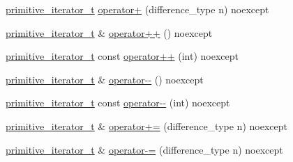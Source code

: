 \begin{DoxyCompactItemize}
\hyperlink{classnlohmann_1_1detail_1_1primitive__iterator__t}{primitive\+\_\+iterator\+\_\+t} \hyperlink{classnlohmann_1_1detail_1_1primitive__iterator__t_a00ce828d0fe58046c10e0445504df7bf}{operator+} (difference\+\_\+type n) noexcept
\item 
\hyperlink{classnlohmann_1_1detail_1_1primitive__iterator__t}{primitive\+\_\+iterator\+\_\+t} \& \hyperlink{classnlohmann_1_1detail_1_1primitive__iterator__t_ad26511012fc88f3ec5d9e1cb708732fd}{operator++} () noexcept
\item 
\hyperlink{classnlohmann_1_1detail_1_1primitive__iterator__t}{primitive\+\_\+iterator\+\_\+t} const \hyperlink{classnlohmann_1_1detail_1_1primitive__iterator__t_aa011863621357b3cf891670bf63a48b1}{operator++} (int) noexcept
\item 
\hyperlink{classnlohmann_1_1detail_1_1primitive__iterator__t}{primitive\+\_\+iterator\+\_\+t} \& \hyperlink{classnlohmann_1_1detail_1_1primitive__iterator__t_abecbf0c73c7fe963a699738065177bc3}{operator-\/-\/} () noexcept
\item 
\hyperlink{classnlohmann_1_1detail_1_1primitive__iterator__t}{primitive\+\_\+iterator\+\_\+t} const \hyperlink{classnlohmann_1_1detail_1_1primitive__iterator__t_aef3b5dfeb2cb04dc9d0a024fc1898b98}{operator-\/-\/} (int) noexcept
\item 
\hyperlink{classnlohmann_1_1detail_1_1primitive__iterator__t}{primitive\+\_\+iterator\+\_\+t} \& \hyperlink{classnlohmann_1_1detail_1_1primitive__iterator__t_aee01535df0b3b40137d9241029a9a203}{operator+=} (difference\+\_\+type n) noexcept
\item 
\hyperlink{classnlohmann_1_1detail_1_1primitive__iterator__t}{primitive\+\_\+iterator\+\_\+t} \& \hyperlink{classnlohmann_1_1detail_1_1primitive__iterator__t_a0bf83ab08abe1ae4b51c790c85cdf151}{operator-\/=} (difference\+\_\+type n) noexcept
\end{DoxyCompactItemize}
